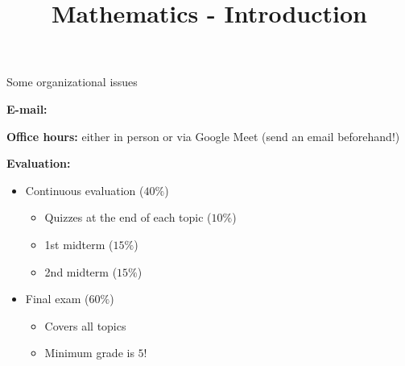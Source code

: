 \documentclass[9pt]{beamer}
\title{\Huge Mathematics - Introduction}
\begin{document}
\maketitle

    
    
    

\begin{frame}{Some organizational issues}

    \textbf{E-mail:} 
    \vspace{0.2cm}
    
    \textbf{Office hours:} either in person or via Google Meet (send an email beforehand!)
    
    \vspace{0.2cm}
    \textbf{Evaluation:} 
    \begin{itemize}
        \item[$\bullet$] Continuous evaluation ($40\%$)
        \begin{itemize}
            \item[-] Quizzes at the end of each topic ($10\%$)
            \item[-] 1st midterm ($15\%$)
            \item[-] 2nd midterm ($15\%$)
        \end{itemize}
        \item[$\bullet$] Final exam ($60\%$)
        \begin{itemize}
            \item[-] Covers all topics 
            \item[-] Minimum grade is $5$!
        \end{itemize}
    \end{itemize}
    
\end{frame}
\end{document}
